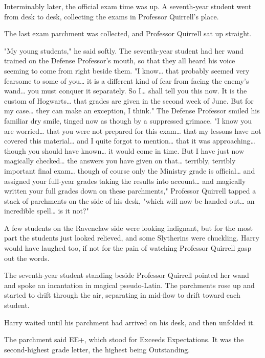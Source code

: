 Interminably later, the official exam time was up. A seventh-year student went
from desk to desk, collecting the exams in Professor Quirrell's place.

The last exam parchment was collected, and Professor Quirrell sat up straight.

"My young students," he said softly. The seventh-year student had her wand
trained on the Defense Professor's mouth, so that they all heard his voice
seeming to come from right beside them. "I know{\ldots} that probably seemed
very fearsome to some of you{\ldots} it is a different kind of fear from facing
the enemy's wand{\ldots} you must conquer it separately. So I{\ldots} shall
tell you this now. It is the custom of Hogwarts{\ldots} that grades are given
in the second week of June. But for my case{\ldots} they can make an exception,
I think." The Defense Professor smiled his familiar dry smile, tinged now as
though by a suppressed grimace. "I know you are worried{\ldots} that you were
not prepared for this exam{\ldots} that my lessons have not covered this
material{\ldots} and I quite forgot to mention{\ldots} that it was
approaching{\ldots} though you should have known{\ldots} it would come in time.
But I have just now magically checked{\ldots} the answers you have given on
that{\ldots} terribly, terribly important final exam{\ldots} though of course
only the Ministry grade is official{\ldots} and assigned your full-year grades
taking the results into account{\ldots} and magically written your full grades
down on these parchments," Professor Quirrell tapped a stack of parchments on
the side of his desk, "which will now be handed out{\ldots} an incredible
spell{\ldots} is it not?"

A few students on the Ravenclaw side were looking indignant, but for the most
part the students just looked relieved, and some Slytherins were chuckling.
Harry would have laughed too, if not for the pain of watching Professor
Quirrell gasp out the words.

The seventh-year student standing beside Professor Quirrell pointed her wand
and spoke an incantation in magical pseudo-Latin. The parchments rose up and
started to drift through the air, separating in mid-flow to drift toward each
student.

Harry waited until his parchment had arrived on his desk, and then unfolded it.

The parchment said EE+, which stood for Exceeds Expectations. It was the
second-highest grade letter, the highest being Outstanding.

